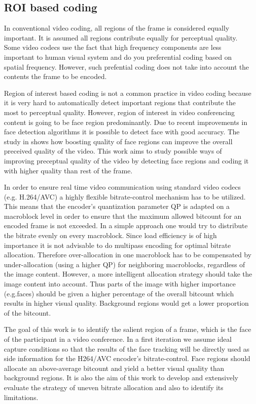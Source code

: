 \documentclass[11pt]{article} %
\begin{document}
  \subsection{ROI based coding}
	In conventional video coding, all regions of the frame is considered equally important. It is assumed all regions contribute equally for perceptual quality. Some video codecs use the fact that high frequency components are less important to human visual system and do you preferential coding based on spatial frequency. However, such prefential coding does not take into account the contents the frame to be encoded. 

Region of interest based coding is not a common practice in video coding because it is very hard to automatically detect important regions that contribute the most to perceptual quality. However, region of interest in video conferencing content is going to be face region predominantly. Due to recent improvements in face detection algorithms it is possible to detect face with good accuracy. The study in \cite{HighQualityROICodingForVideoConferencing} shows how boosting quality of face regions can improve the overall preceived quality of the video. This work aims to study possible ways of improving preceptual quality of the video by detecting face regions and coding it with higher quality than rest of the frame.

In order to ensure real time video communication using standard video codecs (e.g. H.264/AVC) a highly flexible bitrate-control mechanism has to be utilized. This means that the encoder's quantization parameter QP is adapted on a macroblock level in order to ensure that the maximum allowed bitcount for an encoded frame is not exceeded. In a simple approach one would try to distribute the bitrate evenly on every macroblock. Since load efficiency is of high importance it is not advisable to do multipass encoding for optimal bitrate allocation. Therefore over-allocation in one macroblock has to be compensated by under-allocation (using a higher QP) for neighboring macroblocks, regardless of the image content. However, a more intelligent allocation strategy should take the image content into account. Thus parts of the image with higher importance (e.g.faces) should be given a higher percentage of the overall bitcount which results in higher visual quality. Background regions would get a lower proportion of the bitcount.

The goal of this work is to identify the salient region of a frame, which is the face of the participant in a video conference. In a first iteration we assume ideal capture conditions so that the results of the face tracking will be directly used as side information for the H264/AVC encoder's bitrate-control. Face regions should allocate an above-average bitcount and yield a better visual quality than background regions. It is also the aim of this work to develop and extensively evaluate the strategy of uneven bitrate allocation and also to identify its limitations.
\end{document}
